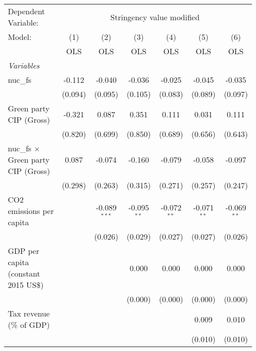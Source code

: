 
\begingroup
\centering
\begin{tabular}{lcccccc}
   \toprule
   Dependent Variable: & \multicolumn{6}{c}{Stringency value modified}\\
   Model:                                     & (1)     & (2)            & (3)           & (4)           & (5)           & (6)\\  
                                              &  OLS    & OLS            & OLS           & OLS           & OLS           & OLS\\  
   \midrule
   \emph{Variables}\\
   nuc\_fs                                    & -0.112  & -0.040         & -0.036        & -0.025        & -0.045        & -0.035\\   
                                              & (0.094) & (0.095)        & (0.105)       & (0.083)       & (0.089)       & (0.097)\\   
   Green party CIP (Gross)                    & -0.321  & 0.087          & 0.351         & 0.111         & 0.031         & 0.111\\   
                                              & (0.820) & (0.699)        & (0.850)       & (0.689)       & (0.656)       & (0.643)\\   
   nuc\_fs $\times$ Green party CIP (Gross)   & 0.087   & -0.074         & -0.160        & -0.079        & -0.058        & -0.097\\   
                                              & (0.298) & (0.263)        & (0.315)       & (0.271)       & (0.257)       & (0.247)\\   
   CO2 emissions per capita                   &         & -0.089$^{***}$ & -0.095$^{**}$ & -0.072$^{**}$ & -0.071$^{**}$ & -0.069$^{**}$\\   
                                              &         & (0.026)        & (0.029)       & (0.027)       & (0.027)       & (0.026)\\   
   GDP per capita (constant 2015 US\$)        &         &                & 0.000         & 0.000         & 0.000         & 0.000\\   
                                              &         &                & (0.000)       & (0.000)       & (0.000)       & (0.000)\\   
   Tax revenue (\% of GDP)                    &         &                &               &               & 0.009         & 0.010\\   
                                              &         &                &               &               & (0.010)       & (0.010)\\   

\end{tabular}
